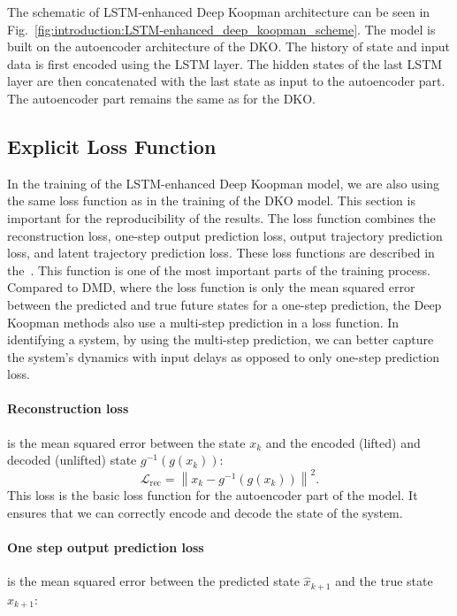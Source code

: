 \documentclass[conference]{IEEEtran}
\begin{document}
The schematic of LSTM-enhanced Deep Koopman architecture can be seen in Fig.~\ref{fig:introduction:LSTM-enhanced_deep_koopman_scheme}. The model is built on the autoencoder architecture of the DKO\@. The history of state and input data is first encoded using the LSTM layer. The hidden states of the last LSTM layer are then concatenated with the last state as input to the autoencoder part. The autoencoder part remains the same as for the DKO\@.

\subsection{Explicit Loss Function}\label{subsec:methodology:explicit_loss}
In the training of the LSTM-enhanced Deep Koopman model, we are also using the same loss function as in the training of the DKO model. 
This section is important for the reproducibility of the results.
The loss function combines the reconstruction loss, one-step output prediction loss, output trajectory prediction loss, and latent trajectory prediction loss. These loss functions are described in the~\cite{lusch2018deep}. This function is one of the most important parts of the training process. Compared to DMD, where the loss function is only the mean squared error between the predicted and true future states for a one-step prediction, the Deep Koopman methods also use a multi-step prediction in a loss function. In identifying a system, by using the multi-step prediction, we can better capture the system's dynamics with input delays as opposed to only one-step prediction loss.

\paragraph*{Reconstruction loss}
is the mean squared error between the state \(x_k\) and the encoded (lifted) and decoded (unlifted) state \(g^{-1}(g(x_k))\):
\begin{equation}
    \mathcal{L}_{\text{rec}} = \left \|x_k - g^{-1}(g(x_k))\right \|^2.
\end{equation}
This loss is the basic loss function for the autoencoder part of the model. It ensures that we can correctly encode and decode the state of the system.

\paragraph*{One step output prediction loss}
is the mean squared error between the predicted state \(\hat{x}_{k+1}\) and the true state \(x_{k+1}\):
\end{document}
